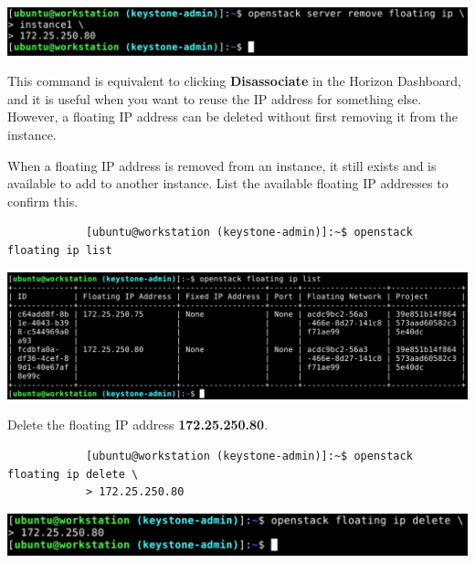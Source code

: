 \documentclass[letterpaper, 12pt]{article}
\begin{document}
\begin{enumerate}
\begin{labstep}
        \begin{center}
            \includegraphics[width=\linewidth]{images/part3/step20.png}
        \end{center}
    \end{labstep}

    \begin{tipbox}
        This command is equivalent to clicking \textbf{Disassociate} in the Horizon Dashboard, and it is useful when you want to reuse the IP address for something else.
        However, a floating IP address can be deleted without first removing it from the instance.
    \end{tipbox}

    \begin{labstep}
        When a floating IP address is removed from an instance, it still exists and is available to add to another instance.
        List the available floating IP addresses to confirm this.
        \begin{lstlisting}
            [ubuntu@workstation (keystone-admin)]:~$ openstack floating ip list
        \end{lstlisting}

        \begin{center}
            \includegraphics[width=\linewidth]{images/part3/step21.png}
        \end{center}
    \end{labstep}

    \begin{labstep}
        Delete the floating IP address \textbf{172.25.250.80}.
        \begin{lstlisting}
            [ubuntu@workstation (keystone-admin)]:~$ openstack floating ip delete \
            > 172.25.250.80
        \end{lstlisting}

        \begin{center}
            \includegraphics[width=\linewidth]{images/part3/step22.png}
        \end{center}
    \end{labstep}


\end{enumerate}
\end{document}
